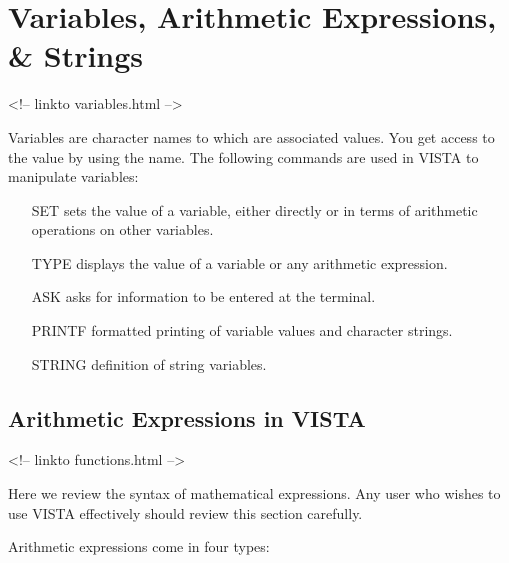 \chapter{Variables, Arithmetic Expressions, \& Strings}
\begin{rawhtml}
<!-- linkto variables.html -->
\end{rawhtml}

%
%


Variables are character names to which are associated values. 
You get access to the value by using the name.  The following commands
are used in VISTA to manipulate variables: 

\begin{itemize}
  \item[SET\hfill]{sets the value of a variable, either directly or in
       terms of arithmetic operations on other variables.}

  \item[TYPE\hfill]{displays the value of a variable or any arithmetic
       expression.}

  \item[ASK\hfill]{asks for information to be entered at the terminal.}

  \item[PRINTF\hfill]{formatted printing of variable values and character
       strings.}

  \item[STRING\hfill]{definition of string variables.}
\end{itemize}

\section{Arithmetic Expressions in VISTA}
\begin{rawhtml}
<!-- linkto functions.html -->
\end{rawhtml}


Here we review the syntax of mathematical expressions.  Any user who wishes
to use VISTA effectively should review this section carefully.

Arithmetic expressions come in four types:

